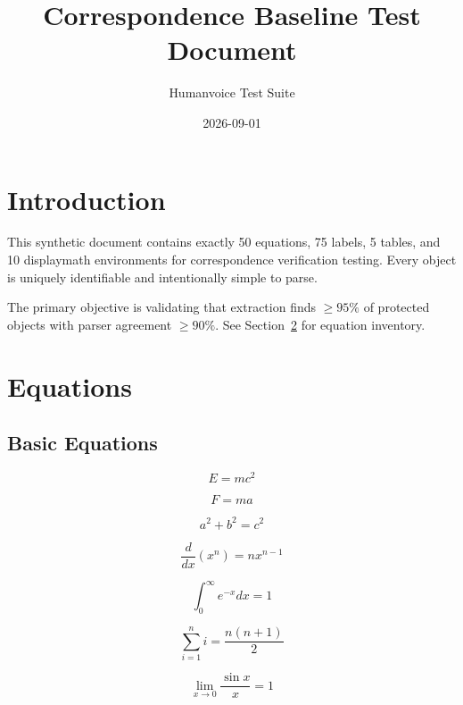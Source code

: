 \documentclass{article}
\title{Correspondence Baseline Test Document}
\author{Humanvoice Test Suite}
\date{2026-09-01}
\begin{document}
\maketitle

\section{Introduction}\label{sec:intro}

This synthetic document contains exactly 50 equations, 75 labels, 5 tables, and 10 displaymath environments for correspondence verification testing. Every object is uniquely identifiable and intentionally simple to parse.

The primary objective is validating that extraction finds $\geq 95\%$ of protected objects with parser agreement $\geq 90\%$. See Section~\ref{sec:equations} for equation inventory.

\section{Equations}\label{sec:equations}

\subsection{Basic Equations}\label{subsec:basic}

\begin{equation}\label{eq:001}
E = mc^2
\end{equation}

\begin{equation}\label{eq:002}
F = ma
\end{equation}

\begin{equation}\label{eq:003}
a^2 + b^2 = c^2
\end{equation}

\begin{equation}\label{eq:004}
\frac{d}{dx}(x^n) = nx^{n-1}
\end{equation}

\begin{equation}\label{eq:005}
\int_0^\infty e^{-x} dx = 1
\end{equation}

\begin{equation}\label{eq:006}
\sum_{i=1}^n i = \frac{n(n+1)}{2}
\end{equation}

\begin{equation}\label{eq:007}
\lim_{x \to 0} \frac{\sin x}{x} = 1
\end{equation}
\end{document}
